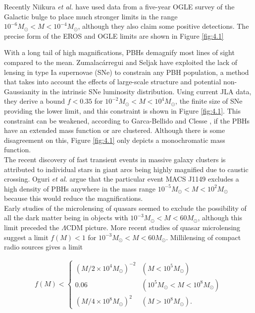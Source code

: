 Recently Niikura \emph{et al.}\cite{Niikura:2019kqi} have used data from a five-year OGLE survey of the Galactic bulge to place much stronger limits in the range $10^{-6} M_{\odot}<M<10^{-4} M_{\odot}$, although they also claim some positive detections. The precise form of the EROS and OGLE limits are shown in Figure \ref{fig:4.1}  

With a long tail of high magnifications, PBHs demagnify most lines of sight compared to the mean. Zumalacárregui and Seljak \cite{Zumalacarregui:2017qqd} have exploited the lack of lensing in type Ia supernovae (SNe) to constrain any PBH population, a method that takes into account the effects of large-scale structure and potential non-Gaussianity in the intrinsic SNe luminosity distribution. Using current JLA data, they derive a bound $f<0.35$ for $10^{-2} M_{\odot}<M<10^4 M_{\odot}$, the finite size of SNe providing the lower limit, and this constraint is shown in Figure \ref{fig:4.1}. This constraint can be weakened, according to Garca-Bellido and Clesse \cite{garc2018PDU....20...95G}, if the PBHs have an extended mass function or are clustered. Although there is some disagreement on this, Figure \ref{fig:4.1}   only depicts a monochromatic mass function.\\

The recent discovery of fast transient events in massive galaxy clusters is attributed to individual stars in giant arcs being highly magnified due to caustic crossing. Oguri \emph{et al.}\cite{Oguri:2017ock} argue that the particular event MACS J1149 excludes a high density of PBHs anywhere in the mass range $10^{-5} M_{\odot}<M<10^2 M_{\odot}$ because this would reduce the magnifications.\\

Early studies of the microlensing of quasars \cite{Dalcanton1994ApJ...424..550D} seemed to exclude the possibility of all the dark matter being in objects with $10^{-3} M_{\odot}<M<60 M_{\odot}$, although this limit preceded the $\Lambda \mathrm{CDM}$ picture. More recent studies of quasar microlensing suggest a limit \cite{Mediavilla_2009} $f(M)<1$ for $10^{-3} M_{\odot}<M<60 M_{\odot}$. Millilensing of compact radio sources \cite{Wilkinson:2001vv} gives a limit

\begin{align}
     f(M)< \begin{cases}\left(M / 2 \times 10^4 M_{\odot}\right)^{-2} & \left(M<10^5 M_{\odot}\right) \\ 0.06 & \left(10^5 M_{\odot}<M<10^8 M_{\odot}\right) \\ \left(M / 4 \times 10^8 M_{\odot}\right)^2 & \left(M>10^8 M_{\odot}\right) .\end{cases}
\end{align}
   
